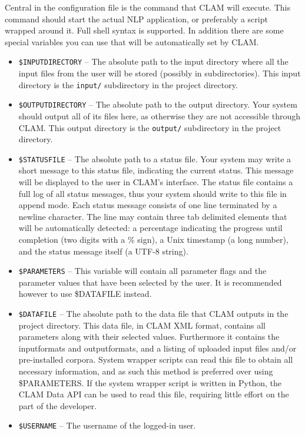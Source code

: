 \documentclass[a4paper,12pt]{report}
\begin{document}
Central in the configuration file is the command that CLAM will execute. This command should start the actual NLP application, or preferably a script wrapped around it. Full shell syntax is supported. In addition there are some special variables you can use that will be automatically set by CLAM. 

\begin{itemize}
\item \texttt{\$INPUTDIRECTORY} -- The absolute path to the input directory where all the input files from the user will be stored (possibly in subdirectories). This input directory is the \texttt{input/} subdirectory in the project directory.
\item \texttt{\$OUTPUTDIRECTORY} -- The absolute path to the output directory. Your system should output all of its files here, as otherwise they are not accessible through CLAM.  This output directory is the \texttt{output/} subdirectory in the project directory.
\item \texttt{\$STATUSFILE} -- The absolute path to a status file. Your system may write a short message to this status file, indicating the current status. This message will be displayed to the user in CLAM's interface. The status file contains a full log of all status messages, thus your system should write to this file in append mode. Each status message consists of one line terminated by a newline character. The line may contain three tab delimited elements that will be automatically detected: a percentage indicating the progress until completion (two digits with a \% sign), a Unix timestamp (a long number), and the status message itself (a UTF-8 string).
\item \texttt{\$PARAMETERS} -- This variable will contain all parameter flags and the parameter values that have been selected by the user. It is recommended however to use \$DATAFILE instead.  
\item \texttt{\$DATAFILE} -- The absolute path to the data file that CLAM outputs in the project directory. This data file, in CLAM XML format, contains all parameters along with their selected values. Furthermore it contains the inputformats and outputformats, and a listing of uploaded input files and/or pre-installed corpora. System wrapper scripts can read this file to obtain all necessary information, and as such this method is preferred over using \$PARAMETERS. If the system wrapper script is written in Python, the CLAM Data API can be used to read this file, requiring little effort on the part of the developer. 
\item \texttt{\$USERNAME} -- The username of the logged-in user.
\end{itemize}
\end{document}
